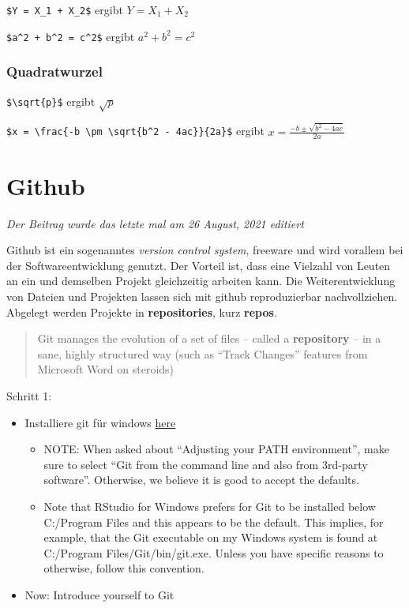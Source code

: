 \documentclass[
]{article}
\providecommand{\tightlist}{%
  \setlength{\itemsep}{0pt}\setlength{\parskip}{0pt}}
\begin{document}
\texttt{\$Y\ =\ X\_1\ +\ X\_2\$} ergibt \(Y = X_1 + X_2\)

\texttt{\$a\^{}2\ +\ b\^{}2\ =\ c\^{}2\$} ergibt \(a^2 + b^2 = c^2\)

\hypertarget{quadratwurzel}{%
\subsubsection{Quadratwurzel}\label{quadratwurzel}}

\texttt{\$\textbackslash{}sqrt\{p\}\$} ergibt \(\sqrt{p}\)

\texttt{\$x\ =\ \textbackslash{}frac\{-b\ \textbackslash{}pm\ \textbackslash{}sqrt\{b\^{}2\ -\ 4ac\}\}\{2a\}\$} ergibt \(x = \frac{-b \pm \sqrt{b^2 - 4ac}}{2a}\)

\hypertarget{github}{%
\section{Github}\label{github}}

\emph{Der Beitrag wurde das letzte mal am 26 August, 2021 editiert}

Github ist ein sogenanntes \emph{version control system}, freeware und wird vorallem bei der Softwareentwicklung genutzt. Der Vorteil ist, dass eine Vielzahl von Leuten an ein und demselben Projekt gleichzeitig arbeiten kann. Die Weiterentwicklung von Dateien und Projekten lassen sich mit github reproduzierbar nachvollziehen. Abgelegt werden Projekte in \textbf{repositories}, kurz \textbf{repos}.

\begin{quote}
Git manages the evolution of a set of files -- called a \textbf{repository} -- in a sane, highly structured way (such as ``Track Changes'' features from Microsoft Word on steroids)
\end{quote}

Schritt 1:

\begin{itemize}
\tightlist
\item
  Installiere git für windows \href{https://gitforwindows.org/}{here}

  \begin{itemize}
  \tightlist
  \item
    NOTE: When asked about ``Adjusting your PATH environment'', make
    sure to select ``Git from the command line and also from
    3rd-party software''. Otherwise, we believe it is good to accept
    the defaults.
  \item
    Note that RStudio for Windows prefers for Git to be installed
    below C:/Program Files and this appears to be the default. This
    implies, for example, that the Git executable on my Windows
    system is found at C:/Program Files/Git/bin/git.exe. Unless you
    have specific reasons to otherwise, follow this convention.
  \end{itemize}
\item
  Now: Introduce yourself to Git
\end{itemize}
\end{document}
